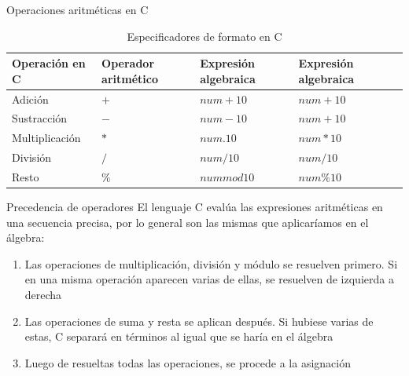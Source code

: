 \documentclass[xcolor=pdftex,table,11pt]{beamer}
\begin{document}
\begin{frame}{Operaciones aritméticas en C}
\begin{table}
\begin{tabular}{p{22mm} | p{22mm} | p{22mm} | p{22mm} | p{22mm} }
Operación en C & Operador aritmético & Expresión algebraica & Expresión algebraica\\
\hline \hline 
Adición 		& 	$+$   & $num + 10$ 	 	& $num + 10$ \\
Sustracción 	& 	$-$	  & $num - 10$ 	 	& $num + 10$ \\
Multiplicación 	& 	$*$   & $num.10$  		& $num * 10$ \\
División 		& 	$/$	  & $num / 10$  	& $num / 10$ \\
Resto 			& 	$\%$  & $num mod 10$  	& $num \% 10$ \\ 

\end{tabular}
\caption{Especificadores de formato en C}
\end{table}




\end{frame}


\begin{frame}{Precedencia de operadores}
El lenguaje C evalúa las expresiones aritméticas en una secuencia precisa, por lo general son las mismas que aplicaríamos en el álgebra:\\

\begin{enumerate}
\item Las operaciones de multiplicación, división y módulo se resuelven primero. Si en una misma operación aparecen varias de ellas, se resuelven de izquierda a derecha

\item Las operaciones de suma y resta se aplican después. Si hubiese varias de estas, C separará en términos al igual que se haría en el álgebra

\item Luego de resueltas todas las operaciones, se procede a la asignación

\end{enumerate}
\end{frame}
\end{document}
